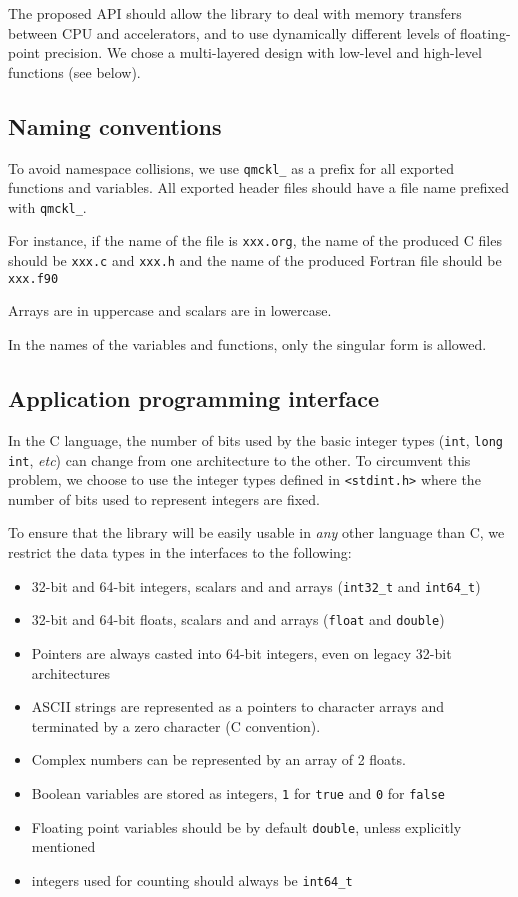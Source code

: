 The proposed \ac{API} should allow the library to deal with memory
transfers between CPU and accelerators, and to use dynamically
different levels of floating-point precision.  We chose a
multi-layered design with low-level and high-level functions (see
below).

\subsection{Naming conventions}

To avoid namespace collisions, we use \texttt{qmckl_} as a prefix for
all exported functions and variables.  All exported header files
should have a file name prefixed with \texttt{qmckl_}.

For instance, if the name of the {\orgmode} file is
\texttt{xxx.org}, the name of the produced C files should
be \texttt{xxx.c} and \texttt{xxx.h} and the
name of the produced Fortran file should be
\texttt{xxx.f90}

Arrays are in uppercase and scalars are in lowercase.

In the  names of  the variables and  functions, only the singular
form is allowed.

\subsection{Application programming interface}

In the C language, the number of bits used by the basic integer types
(\texttt{int}, \texttt{long int}, \textit{etc}) can
change from one architecture to the other. To circumvent this
problem, we choose to use the integer types defined in
\texttt{<stdint.h>} where the number of bits used to represent
integers are fixed.

To ensure that the library will be easily usable in \emph{any} other
language than C, we restrict the data types in the interfaces to the
following:
\begin{itemize}
\item 32-bit and 64-bit integers, scalars and and arrays
  (\texttt{int32_t} and \texttt{int64_t})
\item 32-bit and 64-bit floats, scalars and and arrays
  (\texttt{float} and \texttt{double})
\item Pointers are always casted into 64-bit integers, even on legacy 32-bit architectures
\item ASCII strings are represented as a pointers to character arrays
  and terminated by a zero character (C convention).
\item Complex numbers can be represented by an array of 2 floats.
\item Boolean variables are stored as integers, \texttt{1} for
\texttt{true} and \texttt{0} for \texttt{false}
\item Floating point variables should be by default
\texttt{double}, unless explicitly mentioned
\item integers used for counting should always be \texttt{int64_t}
\end{itemize}

